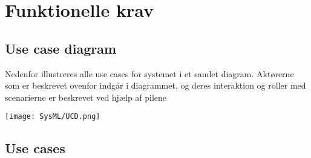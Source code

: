 \chapter{Funktionelle krav}

\section{Use case diagram}
Nedenfor illustreres alle use cases for systemet i et samlet diagram. Aktørerne som er beskrevet ovenfor indgår i diagrammet, og deres interaktion og roller med scenarierne er beskrevet ved hjælp af pilene
\begin{center}
	\texttt{[image: SysML/UCD.png]}
\end{center}



\pagebreak

\section{Use cases}
	
	
	
	
	
	
	
	
	
	
	
	
	
	
	
